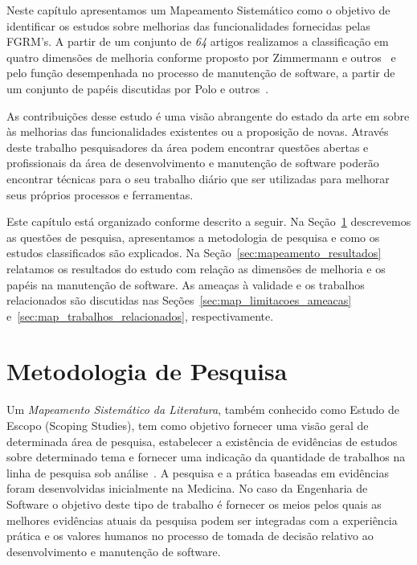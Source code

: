 Neste capítulo apresentamos um Mapeamento Sistemático como o objetivo de
identificar os estudos sobre melhorias das funcionalidades fornecidas pelas
FGRM's. A partir de um conjunto de \textit{64} artigos realizamos a
classificação em quatro dimensões de melhoria conforme proposto por Zimmermann e
outros~\cite{zimmermann2009improving} e pelo função desempenhada no processo de
manutenção de software, a partir de um conjunto de papéis discutidas por Polo e
outros~\cite{Polo1999}.


As contribuições desse estudo é uma visão abrangente do estado da arte em sobre
às melhorias das funcionalidades existentes ou a proposição de novas. Através
deste trabalho pesquisadores da área podem encontrar questões abertas e
profissionais da área de desenvolvimento e manutenção de software poderão
encontrar técnicas para o seu trabalho diário que ser utilizadas para melhorar
seus próprios processos e ferramentas.

Este capítulo está organizado conforme descrito a seguir. Na
Seção~\ref{sec:map-metodologia} descrevemos as questões de pesquisa,
apresentamos a metodologia de pesquisa e como os estudos classificados são
explicados.  Na Seção~\ref{sec:mapeamento_resultados} relatamos os resultados do
estudo com relação as dimensões de melhoria e os papéis na manutenção de
software. As ameaças à validade e os trabalhos relacionados são discutidas nas
Seções~\ref{sec:map_limitacoes_ameacas} e~\ref{sec:map_trabalhos_relacionados},
respectivamente.
\todoend

\section{Metodologia de Pesquisa}
\label{sec:map-metodologia}

Um \textit{Mapeamento Sistemático da Literatura}, também conhecido como Estudo
de Escopo (Scoping Studies), tem como objetivo fornecer uma visão geral de
determinada área de pesquisa, estabelecer a existência de evidências de estudos
sobre determinado tema e fornecer uma indicação da quantidade de trabalhos na
linha de pesquisa sob
análise~\cite{keele2007guidelines,wohlin2012experimentation}. A pesquisa e a
prática baseadas em evidências foram desenvolvidas inicialmente na Medicina. No
caso da Engenharia de Software o objetivo deste tipo de trabalho é fornecer os
meios pelos quais as melhores evidências atuais da pesquisa podem ser integradas
com a experiência prática e os valores humanos no processo de tomada de decisão
relativo ao desenvolvimento e manutenção de software.

